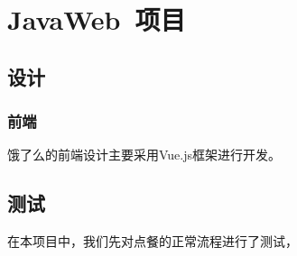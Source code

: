 \chapter{JavaWeb~项目}

\section{设计}
\subsection{前端}
饿了么的前端设计主要采用Vue.js框架进行开发。

\section{测试}
在本项目中，我们先对点餐的正常流程进行了测试，
